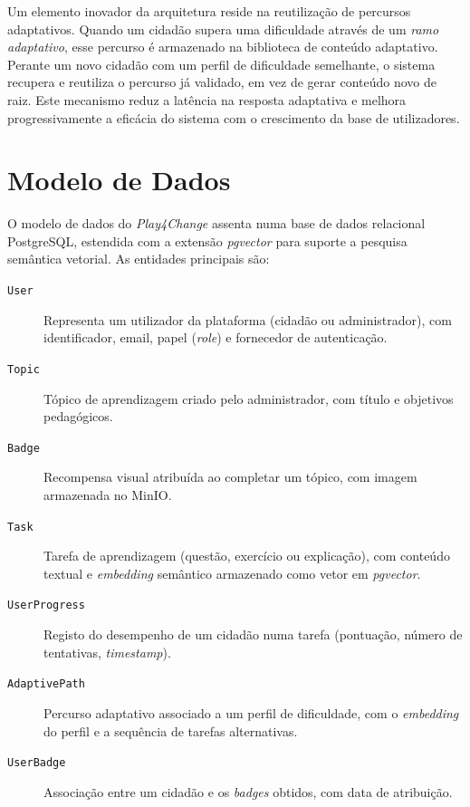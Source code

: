 Um elemento inovador da arquitetura reside na reutilização de percursos adaptativos. Quando um cidadão supera uma dificuldade através de um \textit{ramo adaptativo}, esse percurso é armazenado na biblioteca de conteúdo adaptativo. Perante um novo cidadão com um perfil de dificuldade semelhante, o sistema recupera e reutiliza o percurso já validado, em vez de gerar conteúdo novo de raiz. Este mecanismo reduz a latência na resposta adaptativa e melhora progressivamente a eficácia do sistema com o crescimento da base de utilizadores.

\section{Modelo de Dados}
\label{sec:modelo_dados}

O modelo de dados do \textit{Play4Change} assenta numa base de dados relacional PostgreSQL, estendida com a extensão \textit{pgvector} para suporte a pesquisa semântica vetorial. As entidades principais são:

\begin{description}
  \item[\texttt{User}] Representa um utilizador da plataforma (cidadão ou administrador), com identificador, email, papel (\textit{role}) e fornecedor de autenticação.
  \item[\texttt{Topic}] Tópico de aprendizagem criado pelo administrador, com título e objetivos pedagógicos.
  \item[\texttt{Badge}] Recompensa visual atribuída ao completar um tópico, com imagem armazenada no MinIO.
  \item[\texttt{Task}] Tarefa de aprendizagem (questão, exercício ou explicação), com conteúdo textual e \textit{embedding} semântico armazenado como vetor em \textit{pgvector}.
  \item[\texttt{UserProgress}] Registo do desempenho de um cidadão numa tarefa (pontuação, número de tentativas, \textit{timestamp}).
  \item[\texttt{AdaptivePath}] Percurso adaptativo associado a um perfil de dificuldade, com o \textit{embedding} do perfil e a sequência de tarefas alternativas.
  \item[\texttt{UserBadge}] Associação entre um cidadão e os \textit{badges} obtidos, com data de atribuição.
\end{description}

